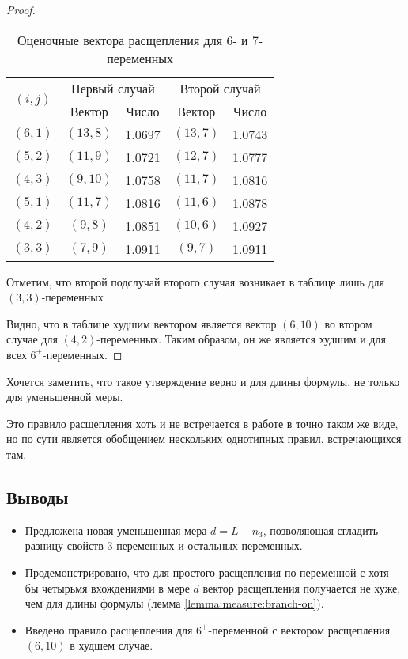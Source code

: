 \begin{proof}
 \begin{table}[ht]
  \centering
  \caption{Оценочные вектора расщепления для 6- и 7-переменных}
  \begin{tabular}{|c|c|c|c|c|}
   \hline
   \multirow{2}{*}{$(i,j)$} & \multicolumn{2}{|c|}{Первый случай} & \multicolumn{2}{|c|}{Второй случай} \\
   \cline{2-5}
                            & Вектор & Число                      & Вектор & Число \\
   \hline
   $(6,1)$ & $(13,8)$ & 1.0697 & $(13,7)$ & 1.0743 \\
   $(5,2)$ & $(11,9)$ & 1.0721 & $(12,7)$ & 1.0777 \\
   $(4,3)$ & $(9,10)$ & 1.0758 & $(11,7)$ & 1.0816 \\
   \hline
   $(5,1)$ & $(11,7)$ & 1.0816 & $(11,6)$ & 1.0878 \\
   $(4,2)$ & $(9,8)$  & 1.0851 & $(10,6)$ & 1.0927 \\
   $(3,3)$ & $(7,9)$  & 1.0911 & $(9,7)$  & 1.0911 \\
   \hline
  \end{tabular}
  \label{table:sixplus}
 \end{table}

Отметим, что второй подслучай второго случая возникает в таблице лишь для $(3,3)$-переменных

Видно, что в таблице худшим вектором является вектор $(6,10)$ во втором случае для $(4,2)$-переменных. Таким образом, он же является худшим и для всех $6^+$-переменных.
\end{proof}

Хочется заметить, что такое утверждение верно и для длины формулы, не только для уменьшенной меры.

Это правило расщепления хоть и не встречается в работе \cite{bansal99} в точно таком же виде, но по сути является обобщением нескольких однотипных правил, встречающихся там.

\subsection{Выводы}
\label{subsec:measure:summary}

\begin{itemize}
 \item Предложена новая уменьшенная мера $d = L - n_3$, позволяющая сгладить разницу свойств 3-переменных и остальных переменных.
 \item Продемонстрировано, что для простого расщепления по переменной с хотя бы четырьмя вхождениями в мере $d$ вектор расщепления получается не хуже, чем для длины формулы (лемма \ref{lemma:measure:branch-on}).
 \item Введено правило расщепления для $6^+$-переменной с вектором расщепления $(6,10)$ в худшем случае.
\end{itemize}

